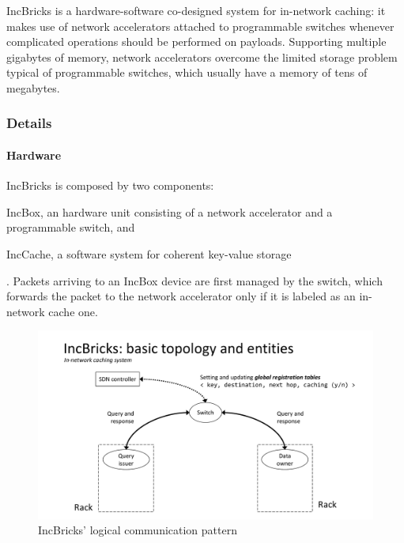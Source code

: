IncBricks \cite{incbricks} is a hardware-software co-designed system for in-network caching: it makes use of network accelerators attached to programmable switches whenever complicated operations should be performed on payloads.
Supporting multiple gigabytes of memory, network accelerators overcome the limited storage problem typical of programmable switches, which usually have a memory of tens of megabytes.

\subsubsection{Details}
\paragraph{Hardware}
IncBricks \cite{incbricks} is composed by two components:
\begin{mylist}
    \item IncBox, an hardware unit consisting of a network accelerator and a programmable switch, and
    \item IncCache, a software system for coherent key-value storage
\end{mylist}.
Packets arriving to an IncBox device are first managed by the switch, which forwards the packet to the network accelerator only if it is labeled as an in-network cache one.

\begin{figure}[!htb]
    \centering
        \includegraphics[page=3, clip, trim=3.6cm 0.7cm 2.5cm 4.15cm, width=1.00\textwidth]{figures/analysis/inp/solutions.pdf}
    \caption{IncBricks' \texorpdfstring{\cite{incbricks}}{} logical communication pattern}
\end{figure}

